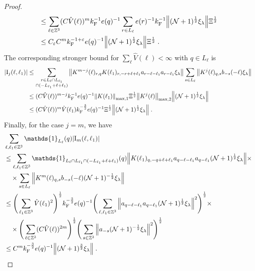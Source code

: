 \documentclass[12pt,a4paper]{article}
\numberwithin{equation}{section}
\newcommand{\1}{\mathbb{I}}
\newcommand{\F}{\mathrm{F}}
\newcommand{\I}{\mathrm{I}}
\newcommand{\Zstar}{\mathbb{Z}^3} %
\newcommand{\Z}{\mathbb{Z}}
\newcommand{\NN}{\mathcal{N}}
\newcommand{\half}{\frac{1}{2}}
\theoremstyle{plain}
\theoremstyle{definition}
\theoremstyle{remark}
\theoremstyle{plain}
\theoremstyle{definition}
\theoremstyle{remark}
\begin{document}
\begin{proof}
\begin{align}
	&\leq \sum_{\ell \in \Zstar} (C \hat{V}(\ell))^m k_{\F}^{-1} e(q)^{-1}
		\sum_{r \in L_\ell} e(r)^{-1} k_{\F}^{-1}
		\norm{ (\NN+1)^{\half} \xi_\lambda}
		\Xi^\half \nonumber\\
	&\leq C_\varepsilon C^m k_{\F}^{-1+\varepsilon} e(q)^{-1}
		\norm{ (\NN+1)^{\half} \xi_\lambda}
		\Xi^\half \;. \label{eq:estEQ2152_Coulomb}
\end{align}
The corresponding stronger bound for $ \sum_\ell \hat{V}(\ell) < \infty $ with $ q \in L_\ell $ is
\begin{align}
	|\I_j(\ell, \ell_1)|
	&\leq \sum_{\substack{r\in L_{\ell} \cap L_{\ell_1}\\ \cap (-L_{\ell_1}+\ell+\ell_1)}}
		\norm{ K^{m-j}(\ell)_{r,q} K(\ell_1)_{r,-r+\ell+\ell_1} a_{r-\ell-\ell_1} a_{r-\ell_1} \xi_\lambda}
		\sum_{s \in L_{\ell}}
		\norm{ K^j(\ell)_{q,s} b_{-s}(-\ell) \xi_\lambda }\nonumber\\
	&\leq (C \hat{V}(\ell))^{m-j} k_{\F}^{-1} e(q)^{-1}
		\norm{K(\ell_1)}_{\max,1} \Xi^{\half}
		\norm{K^j(\ell)}_{\max,2}
		\norm{ (\NN+1)^\half \xi_\lambda} \nonumber\\
	&\leq (C \hat{V}(\ell))^m
		\hat{V}(\ell_1)
		k_{\F}^{-\frac 32} e(q)^{-1} \Xi^\half
		\norm{ (\NN+1)^\half \xi_\lambda} \;. \label{eq:estEQ2152}
\end{align}
Finally, for the case $ j = m $, we have
\begin{align}
	&\sum_{\ell,\ell_1 \in \Zstar} \mathds{1}_{L_\ell}(q) |\I_m(\ell, \ell_1)| \nonumber\\
	&\leq \sum_{\ell,\ell_1 \in \Zstar} \mathds{1}_{L_\ell \cap L_{\ell_1} \cap (-L_{\ell_1} + \ell + \ell_1)}(q) \norm{K(\ell_1)_{q,-q+\ell+\ell_1} a_{q-\ell-\ell_1} a_{q-\ell_1} (\NN+1)^{\half} \xi_\lambda} \times \nonumber\\
	&\quad \times \sum\limits_{ s \in L_{\ell}}
		\norm{ K^m(\ell)_{q,s} b_{-s}(-\ell) (\NN+1)^{-\half} \xi_\lambda }\nonumber\\
	&\leq \Bigg( \sum_{\ell_1 \in \Zstar} \hat{V}(\ell_1)^2 \Bigg)^{\half} 
		k_{\F}^{-\frac 32} e(q)^{-1}
		\Bigg( \sum_{\ell,\ell_1 \in \Z^3} \norm{a_{q-\ell-\ell_1} a_{q-\ell_1} (\NN+1)^{\half} \xi_\lambda}^2 \Bigg)^{\half} \times \nonumber\\
	&\quad \times \Bigg( \sum_{\ell \in \Zstar} (C \hat{V}(\ell))^{2m} \Bigg)^{\half} 
		\Bigg( \sum\limits_{ s \in \Z^3} \norm{ a_{-s} (\NN+1)^{-\half} \xi_\lambda }^2 \Bigg)^{\half} \nonumber\\
	&\leq C^m k_{\F}^{-\frac 32} e(q)^{-1}
		\norm{(\NN+1)^{\frac 32} \xi_\lambda} \;. \label{eq:estEQ2153_Coulomb}

\end{align}
\end{proof}
\end{document}
